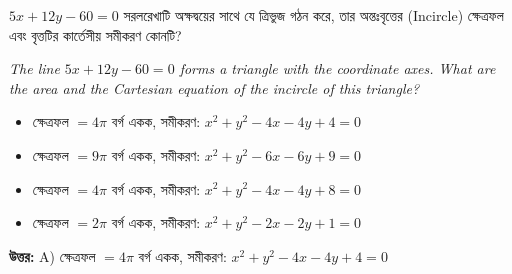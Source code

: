 \documentclass[12pt, a4paper]{article}
\begin{document}
\vspace{2em}

\begin{tcolorbox}[questionbox={প্রশ্ন (Question) 44}]
    \noindent
    $5x + 12y - 60 = 0$ সরলরেখাটি অক্ষদ্বয়ের সাথে যে ত্রিভুজ গঠন করে, তার অন্তঃবৃত্তের (Incircle) ক্ষেত্রফল এবং বৃত্তটির কার্তেসীয় সমীকরণ কোনটি?
    
    \vspace{0.8em}
    \begin{english}
    \noindent\textit{\color{darkgray}
    The line $5x + 12y - 60 = 0$ forms a triangle with the coordinate axes. What are the area and the Cartesian equation of the incircle of this triangle?
    }
    \end{english}
\end{tcolorbox}

\vspace{1em}
\begin{itemize}[label={}, leftmargin=1cm, itemsep=0.5em]
    \item[\textbf{A)}] ক্ষেত্রফল $= 4\pi$ বর্গ একক, সমীকরণ: $x^2 + y^2 - 4x - 4y + 4 = 0$
    \item[\textbf{B)}] ক্ষেত্রফল $= 9\pi$ বর্গ একক, সমীকরণ: $x^2 + y^2 - 6x - 6y + 9 = 0$
    \item[\textbf{C)}] ক্ষেত্রফল $= 4\pi$ বর্গ একক, সমীকরণ: $x^2 + y^2 - 4x - 4y + 8 = 0$
    \item[\textbf{D)}] ক্ষেত্রফল $= 2\pi$ বর্গ একক, সমীকরণ: $x^2 + y^2 - 2x - 2y + 1 = 0$
\end{itemize}

\vspace{0.5em}
\begin{tcolorbox}[answerbox]
    \textbf{\color{success} উত্তর:} A) ক্ষেত্রফল $= 4\pi$ বর্গ একক, সমীকরণ: $x^2 + y^2 - 4x - 4y + 4 = 0$
\end{tcolorbox}
\vspace{1em}
\end{document}
